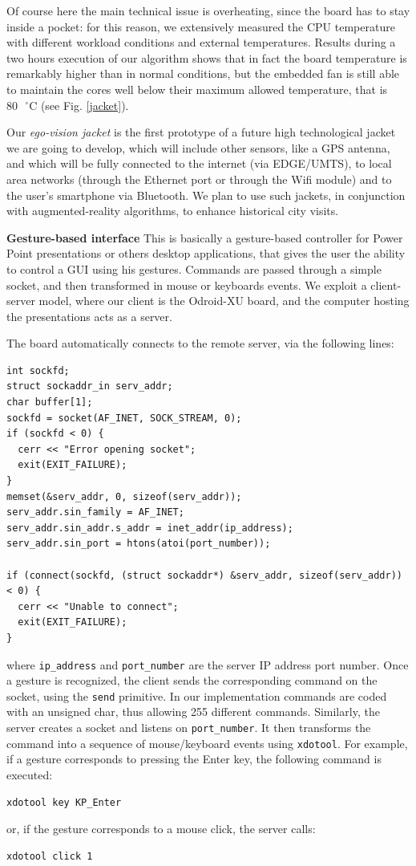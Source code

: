 Of course here the main technical issue is overheating, since the board has to stay inside a pocket: for this reason, we extensively measured the CPU temperature with different workload conditions and external temperatures. Results during a two hours execution of our algorithm shows that in fact the board temperature is remarkably higher than in normal conditions, but the embedded fan is still able to maintain the cores well below their maximum allowed temperature, that is $80\text{ }^{\circ}\text{C}$ (see Fig. \ref{jacket}).

Our \textit{ego-vision jacket} is the first prototype of a future high technological jacket we are going to develop, which will include other sensors, like a GPS antenna, and which will be fully connected to the internet (via EDGE/UMTS), to local area networks (through the Ethernet port or through the Wifi module) and to the user's smartphone via Bluetooth. We plan to use such jackets, in conjunction with augmented-reality algorithms, to enhance historical city visits.

\textbf{Gesture-based interface}
This is basically a gesture-based controller for Power Point presentations or others desktop applications, that gives the user the ability to control a GUI using his gestures. Commands are passed through a simple socket, and then transformed in mouse or keyboards events. We exploit a client-server model, where our client is the Odroid-XU board, and the computer hosting the presentations acts as a server.

The board automatically connects to the remote server, via the following lines:
\begin{lstlisting}[frame=single]
int sockfd;
struct sockaddr_in serv_addr;
char buffer[1];
sockfd = socket(AF_INET, SOCK_STREAM, 0);
if (sockfd < 0) {
  cerr << "Error opening socket";
  exit(EXIT_FAILURE);
}
memset(&serv_addr, 0, sizeof(serv_addr));
serv_addr.sin_family = AF_INET;
serv_addr.sin_addr.s_addr = inet_addr(ip_address);
serv_addr.sin_port = htons(atoi(port_number));

if (connect(sockfd, (struct sockaddr*) &serv_addr, sizeof(serv_addr)) < 0) {
  cerr << "Unable to connect";
  exit(EXIT_FAILURE);
}
\end{lstlisting}
where \verb+ip_address+ and \verb+port_number+ are the server IP address port number. Once a gesture is recognized, the client sends the corresponding command on the socket, using the \verb+send+ primitive. In our implementation commands are coded with an unsigned char, thus allowing 255 different commands. Similarly, the server creates a socket and listens on \verb+port_number+. It then transforms the command into a sequence of mouse/keyboard events using \verb+xdotool+. For example, if a gesture corresponds to pressing the Enter key, the following command is executed:
\begin{lstlisting}[frame=single]
xdotool key KP_Enter
\end{lstlisting}
or, if the gesture corresponds to a mouse click, the server calls:
\begin{lstlisting}[frame=single]
xdotool click 1
\end{lstlisting}

